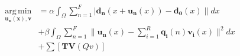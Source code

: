 \documentclass[border={5pt 5pt 5pt 5pt}]{standalone}
\begin{document}
	\begin{align}
	    \operatorname*{arg\,min}_{\bm{u_n}(\bm{x}), \bm{v}}&=\alpha \int_{\Omega}\sum_{n=1}^F|\bm{d_n}(x+\bm{u_n}(x))-\bm{d_0}(x)\| dx  \label{eq:costfunc}\\
	    &+ \beta \int_{\Omega}\sum_{n=1}^F\|\bm{u_n}(x)-\sum_{i=1}^R\bm{q_i}(n)\bm{v_i}(x)\|^2 dx \label{eq:lowrank}\\
	    &+ \sum[\bm{TV}(Qv)]
	\end{align}
\end{document}
